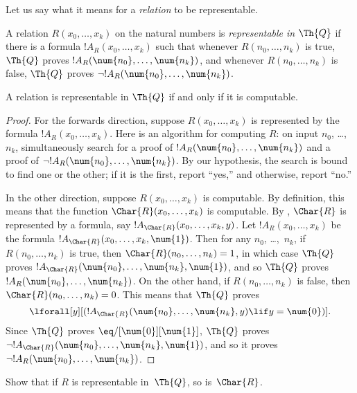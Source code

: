 \documentclass[../../../include/open-logic-section]{subfiles}
\begin{document}


Let us say what it means for a \emph{relation} to be representable.

\begin{defn}
 A relation $R(x_0,\dots,x_k)$ on
the natural numbers is {\em representable in $\Th{Q}$} if there is a
formula $!A_R(x_0,\dots,x_k)$ such that whenever $R(n_0,\dots,n_k)$ is
true, $\Th{Q}$ proves $!A_R(\num{n_0},\dots,\num{n_k})$, and whenever
$R(n_0,\dots,n_k)$ is false, $\Th{Q}$ proves $\lnot !A_R(\num{n_0},
\dots, \num{n_k})$.
\end{defn}

\begin{thm}
 A relation is representable in
$\Th{Q}$ if and only if it is computable.
\end{thm}

\begin{proof}
For the forwards direction, suppose $R(x_0,\dots,x_k)$ is
represented by the formula $!A_R(x_0,\dots,x_k)$. Here is an
algorithm for computing $R$: on input $n_0$, \dots,~$n_k$, simultaneously
search for a proof of $!A_R(\num{n_0}, \dots, \num{n_k})$ and a proof of
$\lnot !A_R(\num{n_0}, \dots, \num{n_k})$. By our hypothesis, the search
is bound to find one or the other; if it is the first, report ``yes,''
and otherwise, report ``no.''

In the other direction, suppose $R(x_0, \dots, x_k)$ is computable. By
definition, this means that the function $\Char{R}(x_0, \dots, x_k)$
is computable. By , $\Char{R}$
is represented by a formula, say $!A_{\Char{R}}(x_0, \dots, x_k,
y)$. Let $!A_R(x_0, \dots, x_k)$ be the formula $!A_{\Char{R}}(x_0,
\dots, x_k, \num{1})$. Then for any $n_0$, \dots,~$n_k$, if $R(n_0,
\dots, n_k)$ is true, then $\Char{R}(n_0, \dots, n_k) = 1$, in which
case $\Th{Q}$ proves $!A_{\Char{R}}(\num{n_0}, \dots, \num{n_k},
\num{1})$, and so $\Th{Q}$ proves $!A_R(\num{n_0}, \dots,
\num{n_k})$. On the other hand, if $R(n_0, \dots, n_k)$ is false, then
$\Char{R}(n_0, \dots, n_k) = 0$. This means that $\Th{Q}$ proves
\[
\lforall[y][(!A_{\Char{R}}(\num{n_0}, \dots, \num{n_k}, y) \lif y =
  \num{0})].
\]
Since $\Th{Q}$ proves $\eq/[\num{0}][\num{1}]$, $\Th{Q}$ proves
$\lnot !A_{\Char{R}}(\num{n_0}, \dots, \num{n_k}, \num{1})$, and so it
proves $\lnot !A_R(\num{n_0}, \dots, \num{n_k})$.
\end{proof}

\begin{prob}
Show that if $R$ is representable in~$\Th{Q}$, so is~$\Char{R}$.
\end{prob}
\end{document}
